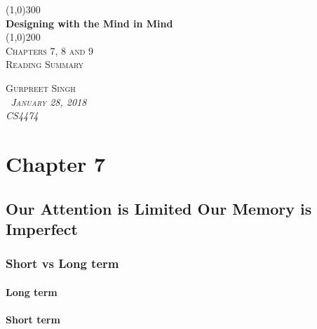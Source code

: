 \documentclass[11pt,]{article}
\let\oldparagraph\paragraph
\renewcommand{\paragraph}[1]{\oldparagraph{#1}\mbox{}}
\begin{document}
\begin{titlepage}
    \begin{center}
    \line(1,0){300} \\ 
    [0.25in]
    \huge{\bfseries Designing with the Mind in Mind} \\
    [2mm]
    \line(1,0){200} \\
    [1.5cm] 
    \textsc{\Large Chapters 7, 8 and 9} \\
    [0.75cm]
    \textsc{\Large Reading Summary} \\
    [12cm]
    \end{center}
    
    \begin{flushright}
    \textsc{\Large{Gurpreet Singh \\}\normalsize\emph{\ January 28, 2018 \\}\normalsize\emph{CS4474 \\} }
    
    \end{flushright}

\end{titlepage}

\newpage
\shipout\null

\hypertarget{chapter-7}{%
\section{Chapter 7}\label{chapter-7}}

\hypertarget{our-attention-is-limited-our-memory-is-imperfect}{%
\subsection{Our Attention is Limited Our Memory is
Imperfect}\label{our-attention-is-limited-our-memory-is-imperfect}}

\hypertarget{short-vs-long-term}{%
\subsubsection{Short vs Long term}\label{short-vs-long-term}}

\hypertarget{long-term}{%
\paragraph{Long term}\label{long-term}}

\hypertarget{short-term}{%
\paragraph{Short term}\label{short-term}}
\end{document}

